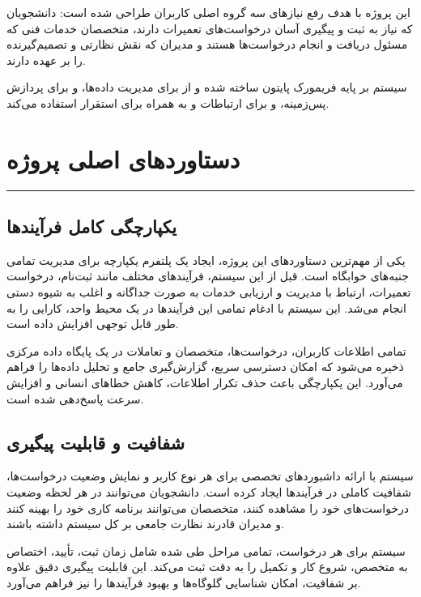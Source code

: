 \documentclass[12pt,a4paper]{report}
\begin{document}
	این پروژه با هدف رفع نیازهای سه گروه اصلی کاربران طراحی شده است: دانشجویان که نیاز به ثبت و پیگیری آسان درخواست‌های تعمیرات دارند، متخصصان خدمات فنی که مسئول دریافت و انجام درخواست‌ها هستند و مدیران که نقش نظارتی و تصمیم‌گیرنده را بر عهده دارند.
	
	سیستم بر پایه فریمورک  پایتون ساخته شده و از  برای مدیریت داده‌ها،  و  برای پردازش پس‌زمینه،  و  برای ارتباطات  و  به همراه  برای استقرار استفاده می‌کند.
	
	\section{دستاوردهای اصلی پروژه}
	\noindent\rule{\textwidth}{0.4pt}
	
	\subsection{یکپارچگی کامل فرآیندها}
	
	یکی از مهم‌ترین دستاوردهای این پروژه، ایجاد یک پلتفرم یکپارچه برای مدیریت تمامی جنبه‌های خوابگاه است. قبل از این سیستم، فرآیندهای مختلف مانند ثبت‌نام، درخواست تعمیرات، ارتباط با مدیریت و ارزیابی خدمات به صورت جداگانه و اغلب به شیوه دستی انجام می‌شد. این سیستم با ادغام تمامی این فرآیندها در یک محیط واحد، کارایی را به طور قابل توجهی افزایش داده است.
	
	تمامی اطلاعات کاربران، درخواست‌ها، متخصصان و تعاملات در یک پایگاه داده مرکزی ذخیره می‌شود که امکان دسترسی سریع، گزارش‌گیری جامع و تحلیل داده‌ها را فراهم می‌آورد. این یکپارچگی باعث حذف تکرار اطلاعات، کاهش خطاهای انسانی و افزایش سرعت پاسخ‌دهی شده است.
	
	\subsection{شفافیت و قابلیت پیگیری}
	
	سیستم با ارائه داشبوردهای تخصصی برای هر نوع کاربر و نمایش وضعیت  درخواست‌ها، شفافیت کاملی در فرآیندها ایجاد کرده است. دانشجویان می‌توانند در هر لحظه وضعیت درخواست‌های خود را مشاهده کنند، متخصصان می‌توانند برنامه کاری خود را بهینه کنند و مدیران قادرند نظارت جامعی بر کل سیستم داشته باشند.
	
	سیستم  برای هر درخواست، تمامی مراحل طی شده شامل زمان ثبت، تأیید، اختصاص به متخصص، شروع کار و تکمیل را به دقت ثبت می‌کند. این قابلیت پیگیری دقیق علاوه بر شفافیت، امکان شناسایی گلوگاه‌ها و بهبود فرآیندها را نیز فراهم می‌آورد.
	
\end{document}
